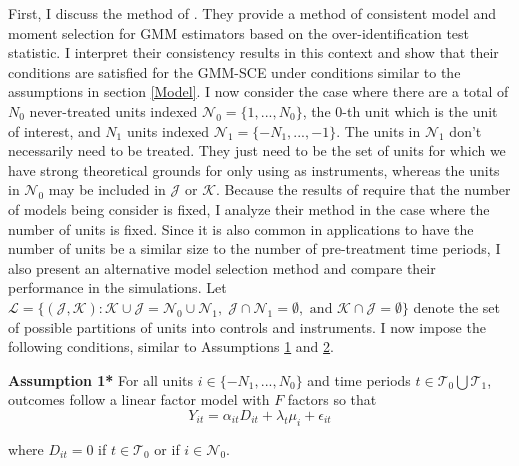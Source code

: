 \documentclass{article}
\begin{document}
First, I discuss the method of \cite{MomentSelection}. They provide a method of consistent model and moment selection for GMM estimators based on the over-identification test statistic. I interpret their consistency results in this context and show that their conditions are satisfied for the GMM-SCE under conditions similar to the assumptions in section \ref{Model}. I now consider the case where there are a total of $N_0$ never-treated units indexed $\mathcal{N}_0 = \{1,...,N_0\}$, the $0$-th unit which is the unit of interest, and $N_1$ units indexed $\mathcal{N}_1 = \{-N_1,...,-1\}$. The units in $\mathcal{N}_1$ don't necessarily need to be treated. They just need to be the set of units for which we have strong theoretical grounds for only using as instruments, whereas the units in $\mathcal{N}_0$ may be included in $\mathcal{J}$ or $\mathcal{K}$. Because the results of \cite{MomentSelection} require that the number of models being consider is fixed, I analyze their method in the case where the number of units is fixed. Since it is also common in applications to have the number of units be a similar size to the number of pre-treatment time periods, I also present an alternative model selection method and compare their performance in the simulations. Let $\mathcal{L} = \{(\mathcal{J},\mathcal{K}) : \mathcal{K} \cup \mathcal{J} = \mathcal{N}_0 \cup \mathcal{N}_1,\;\mathcal{J}\cap\mathcal{N}_1= \emptyset, \text{ and } \mathcal{K} \cap \mathcal{J} = \emptyset \}$ denote the set of possible partitions of units into controls and instruments. I now impose the following conditions, similar to Assumptions \hyperref[A1]{1} and \hyperref[A2]{2}.
\par 
\textbf{Assumption 1*} \label{A1*} For all units $i \in \{-N_1,...,N_0\}$ and time periods $t \in \mathcal{T}_0\bigcup \mathcal{T}_1$, outcomes follow a linear factor model with $F$ factors so that
\begin{equation*}
    Y_{it} = \alpha_{it} D_{it} + \lambda_t \mu_i  + \epsilon_{it} 
\end{equation*}

where $D_{it} = 0$ if $t \in \mathcal{T}_0$ or if $i \in \mathcal{N}_0$. 
\end{document}
